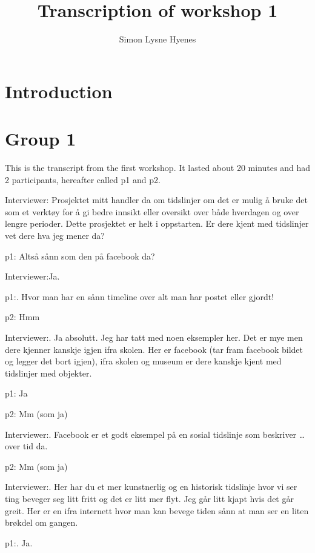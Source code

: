 \documentclass[../../MasterThesis.tex]{subfiles}
\author{Simon Lysne Hyenes}
\title{Transcription of workshop 1}
\begin{document}
\maketitle{}

\section{Introduction}

\section{Group 1}
This is the transcript from the first workshop. It lasted about 20 minutes and had 2 participants, hereafter called p1 and p2.

\textcolor{myBlue} {Interviewer:} Prosjektet mitt handler da om tidslinjer om det er mulig å bruke det som et verktøy for å gi bedre innsikt eller oversikt over både hverdagen og over lengre perioder. Dette prosjektet er helt i oppstarten. Er dere kjent med tidslinjer vet dere hva jeg mener da?

\textcolor{myGreen} {p1:} Altså sånn som den på facebook da?

\textcolor{myBlue} {Interviewer:}Ja. 

\textcolor{myGreen} {p1:}. Hvor man har en sånn timeline over alt man har postet eller gjordt!

\textcolor{myYellow} {p2:} Hmm

\textcolor{myBlue} {Interviewer:}. Ja absolutt. Jeg har tatt med noen eksempler her. Det er mye men dere kjenner kanskje igjen ifra skolen. Her er facebook (tar fram facebook bildet og legger det bort igjen), ifra skolen og museum er dere kanskje kjent med tidslinjer med objekter.

\textcolor{myGreen} {p1:} Ja

\textcolor{myYellow} {p2:} Mm (som ja)

\textcolor{myBlue} {Interviewer:}. Facebook er et godt eksempel på en sosial tidslinje som beskriver \dots over tid da. 

\textcolor{myYellow} {p2:} Mm (som ja)

\textcolor{myBlue} {Interviewer:}. Her har du et mer kunstnerlig og en historisk tidslinje hvor vi ser ting beveger seg litt fritt og det er litt mer flyt. Jeg går litt kjapt hvis det går greit. Her er en ifra internett hvor man kan bevege tiden sånn at man ser en liten brøkdel om gangen. 

\textcolor{myGreen} {p1:}. Ja.
\end{document}

